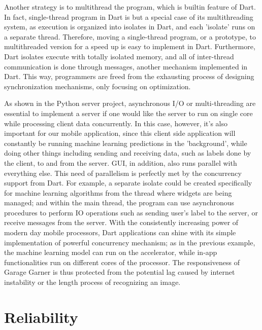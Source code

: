 \documentclass[letterpaper,twocolumn,10pt]{article}
\begin{document}
Another strategy is to multithread the program, which is builtin feature of Dart.
In fact, single-thread program in Dart is but a special case of its multithreading system, as execution is organized into isolates in Dart, 
and each 'isolate' runs on a separate thread.
Therefore, moving a single-thread program, or a prototype, to multithreaded version for a speed up is easy to implement in Dart.
Furthermore, Dart isolates execute with totally isolated memory, and all of inter-thread communication is done through messages, another mechanism implemented in Dart.
This way, programmers are freed from the exhausting process of designing synchronization mechanisms, only focusing on optimization.

As shown in the Python server project, asynchronous I/O or multi-threading are essential to implement a server if one would like the server to run on single core while processing client data concurrently.
In this case, however, it's also important for our mobile application, since this client side application will constantly be running machine learning predictions
in the 'background', while doing other things including sending and receiving data, such as labels done by the client, to and from the server.
GUI, in addition, also runs parallel with everything else.
This need of parallelism is perfectly met by the concurrency support from Dart.
For example, a separate isolate could be created specifically for machine learning algorithms from the thread where widgets are being managed;
and within the main thread, the program can use asynchronous procedures to perform IO operations such as sending user's label to the server, or receive messages from the server.
With the consistently increasing power of modern day mobile processors, Dart applications can shine with its simple implementation of powerful concurrency mechanism;
as in the previous example, the machine learning model can run on the accelerator, while in-app functionalities run on different cores of the processor.
The responsiveness of Garage Garner is thus protected from the potential lag caused by internet instability or the length process of recognizing an image.

\section{Reliability}
\end{document}
